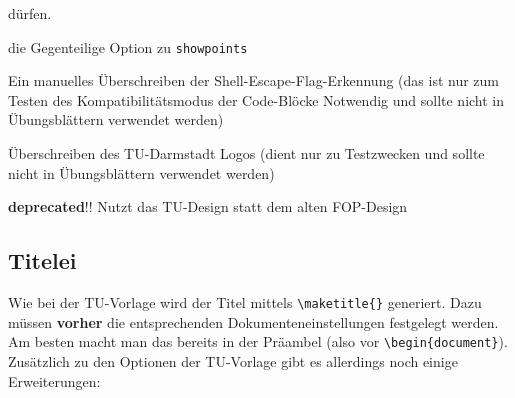 \documentclass[
    titleprefix=AlgoTeX,
    inlineshortcut=java,
    corporatedesign,
    boxarc,
]{algoexercise}
\begin{document}
\begin{description}[leftmargin = 3cm]
            dürfen.
        \item[hidepoints] die Gegenteilige Option zu \verb+showpoints+
        \item[shell\_escape] Ein manuelles Überschreiben der Shell-Escape-Flag-Erkennung (das ist nur zum Testen des
            Kompatibilitätsmodus der Code-Blöcke Notwendig und sollte nicht in Übungsblättern verwendet werden)
        \item[logopath] Überschreiben des TU-Darmstadt Logos (dient nur zu Testzwecken und sollte nicht in Übungsblättern
            verwendet
            werden)
        \item[corporatedesign] \textbf{deprecated}!!
            Nutzt das TU-Design statt dem alten FOP-Design
    \end{description}
    \vspace{-1em} \subsection{Titelei} \vspace{-1em}\sloppy Wie bei
    der TU-Vorlage wird der Titel mittels \verb+\maketitle{}+ generiert.
    Dazu müssen \textbf{vorher} die entsprechenden Dokumenteneinstellungen festgelegt werden.
    Am besten macht man das bereits in der Präambel (also vor \verb+\begin{document}+).
    Zusätzlich zu den Optionen der TU-Vorlage gibt es allerdings noch einige Erweiterungen:
\end{document}
